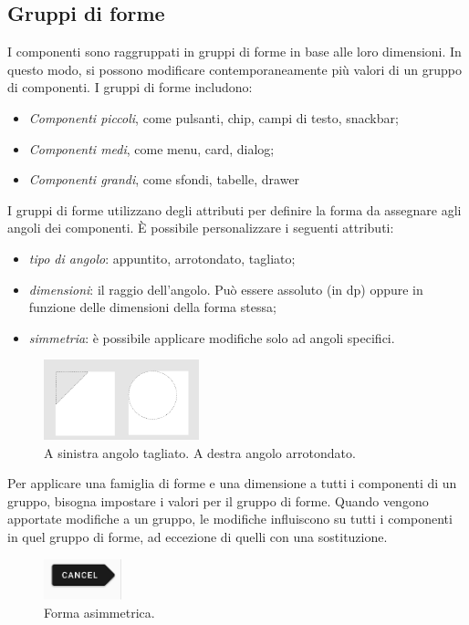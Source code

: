 \documentclass[12pt, a4paper]{report}
\begin{document}
	\subsection{Gruppi di forme}
	I componenti sono raggruppati in gruppi di forme in base alle loro dimensioni. In questo modo, si possono modificare contemporaneamente più valori di un gruppo di componenti. I gruppi di forme includono:
	\begin{itemize}
		\item \textit{Componenti piccoli}, come pulsanti, chip, campi di testo, snackbar;
		\item \textit{Componenti medi}, come menu, card, dialog;
		\item \textit{Componenti grandi}, come sfondi, tabelle, drawer
	\end{itemize}


	I gruppi di forme utilizzano degli attributi per definire la forma da assegnare agli angoli dei componenti. È possibile personalizzare i seguenti attributi:
	\begin{itemize}
		\item \textit{tipo di angolo}: appuntito, arrotondato, tagliato;
		\item \textit{dimensioni}: il raggio dell'angolo. Può essere assoluto (in dp) oppure in funzione delle dimensioni della forma stessa;
		\item \textit{simmetria}: è possibile applicare modifiche solo ad angoli specifici.
	\end{itemize}

	\begin{figure}[h]
		\centering
		\includegraphics[width=0.4\textwidth]{Angoli} %
		\caption{A sinistra angolo tagliato. A destra angolo arrotondato. }
	\end{figure}


	Per applicare una famiglia di forme e una dimensione a tutti i componenti di un gruppo, bisogna impostare i valori per il gruppo di forme. Quando vengono apportate modifiche a un gruppo, le modifiche influiscono su tutti i componenti in quel gruppo di forme, ad eccezione di quelli con una sostituzione.
	\begin{figure}[h]
		\centering
		\includegraphics[width=0.2\textwidth]{asimmetry} %
		\caption{Forma asimmetrica.}
	\end{figure}
\end{document}
